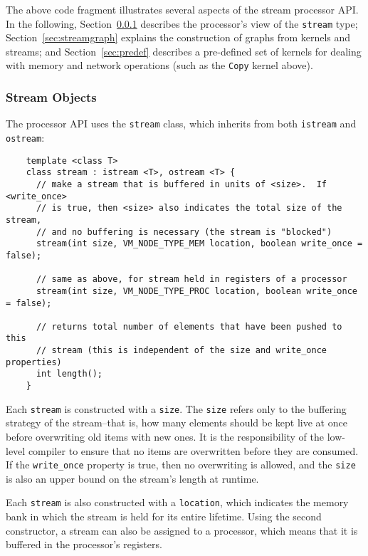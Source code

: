 The above code fragment illustrates several aspects of the stream
processor API.  In the following, Section~\ref{sec:procstreams}
describes the processor's view of the {\tt stream} type;
Section~\ref{sec:streamgraph} explains the construction of graphs from
kernels and streams; and Section~\ref{sec:predef} describes a
pre-defined set of kernels for dealing with memory and network
operations (such as the {\tt Copy} kernel above).

\subsubsection{Stream Objects}
\label{sec:procstreams}

The processor API uses the {\tt stream} class, which inherits from
both {\tt istream} and {\tt ostream}:
{\small
\begin{verbatim}
    template <class T> 
    class stream : istream <T>, ostream <T> {
      // make a stream that is buffered in units of <size>.  If <write_once>
      // is true, then <size> also indicates the total size of the stream,
      // and no buffering is necessary (the stream is "blocked")
      stream(int size, VM_NODE_TYPE_MEM location, boolean write_once = false);

      // same as above, for stream held in registers of a processor
      stream(int size, VM_NODE_TYPE_PROC location, boolean write_once = false);

      // returns total number of elements that have been pushed to this
      // stream (this is independent of the size and write_once properties)
      int length();
    }  
\end{verbatim}}

Each {\tt stream} is constructed with a {\tt size}.  The {\tt size}
refers only to the buffering strategy of the stream--that is, how many
elements should be kept live at once before overwriting old items with
new ones.  It is the responsibility of the low-level compiler to
ensure that no items are overwritten before they are consumed.  If the
{\tt write\_once} property is true, then no overwriting is allowed,
and the {\tt size} is also an upper bound on the stream's length at
runtime.

Each {\tt stream} is also constructed with a {\tt location}, which
indicates the memory bank in which the stream is held for its entire
lifetime.  Using the second constructor, a stream can also be assigned
to a processor, which means that it is buffered in the processor's
registers.

